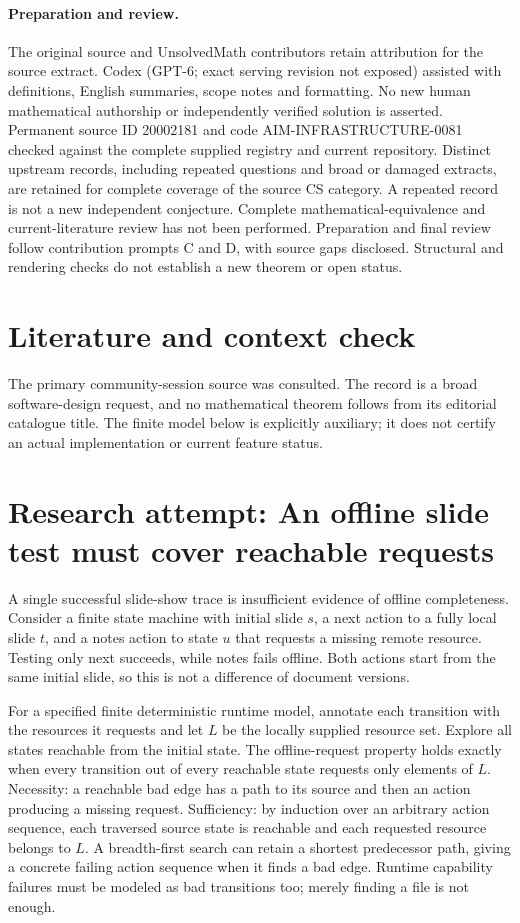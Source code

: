 \documentclass[11pt]{article}
\begin{document}
\paragraph{Preparation and review.}
The original source and UnsolvedMath contributors retain attribution for the source extract. Codex (GPT-6; exact serving revision not exposed) assisted with definitions, English summaries, scope notes and formatting. No new human mathematical authorship or independently verified solution is asserted. Permanent source ID 20002181 and code AIM-INFRASTRUCTURE-0081 checked against the complete supplied registry and current repository. Distinct upstream records, including repeated questions and broad or damaged extracts, are retained for complete coverage of the source CS category. A repeated record is not a new independent conjecture. Complete mathematical-equivalence and current-literature review has not been performed. Preparation and final review follow contribution prompts C and D, with source gaps disclosed. Structural and rendering checks do not establish a new theorem or open status.
\label{end:20002181}

\section{Literature and context check}
The primary community-session source was consulted. The record is a broad software-design request, and no mathematical theorem follows from its editorial catalogue title. The finite model below is explicitly auxiliary; it does not certify an actual implementation or current feature status.
\section{Research attempt: An offline slide test must cover reachable requests}
A single successful slide-show trace is insufficient evidence of offline completeness. Consider a finite state machine with initial slide $s$, a next action to a fully local slide $t$, and a notes action to state $u$ that requests a missing remote resource. Testing only next succeeds, while notes fails offline. Both actions start from the same initial slide, so this is not a difference of document versions.

For a specified finite deterministic runtime model, annotate each transition with the resources it requests and let $L$ be the locally supplied resource set. Explore all states reachable from the initial state. The offline-request property holds exactly when every transition out of every reachable state requests only elements of $L$. Necessity: a reachable bad edge has a path to its source and then an action producing a missing request. Sufficiency: by induction over an arbitrary action sequence, each traversed source state is reachable and each requested resource belongs to $L$. A breadth-first search can retain a shortest predecessor path, giving a concrete failing action sequence when it finds a bad edge. Runtime capability failures must be modeled as bad transitions too; merely finding a file is not enough.
\end{document}
